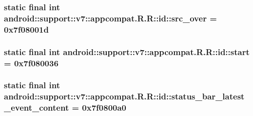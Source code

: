 \hypertarget{classandroid_1_1support_1_1v7_1_1appcompat_1_1_r_1_1id_4baa136214e85c7861ee17eafff51c83}{
\subsubsection[{src\_\-over}]{\setlength{\rightskip}{0pt plus 5cm}static final int android::support::v7::appcompat.R.R::id::src\_\-over = 0x7f08001d}}
\label{classandroid_1_1support_1_1v7_1_1appcompat_1_1_r_1_1id_4baa136214e85c7861ee17eafff51c83}


\hypertarget{classandroid_1_1support_1_1v7_1_1appcompat_1_1_r_1_1id_8ca1a32f00ccefedfda54a14e90e9d2b}{
\subsubsection[{start}]{\setlength{\rightskip}{0pt plus 5cm}static final int android::support::v7::appcompat.R.R::id::start = 0x7f080036}}
\label{classandroid_1_1support_1_1v7_1_1appcompat_1_1_r_1_1id_8ca1a32f00ccefedfda54a14e90e9d2b}


\hypertarget{classandroid_1_1support_1_1v7_1_1appcompat_1_1_r_1_1id_d23dead765fef65efa0d234e238eba6e}{
\subsubsection[{status\_\-bar\_\-latest\_\-event\_\-content}]{\setlength{\rightskip}{0pt plus 5cm}static final int android::support::v7::appcompat.R.R::id::status\_\-bar\_\-latest\_\-event\_\-content = 0x7f0800a0}}
\label{classandroid_1_1support_1_1v7_1_1appcompat_1_1_r_1_1id_d23dead765fef65efa0d234e238eba6e}


